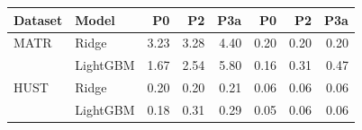 \begin{tabular}{llrrrrrr}
\toprule
Dataset & Model & P0 & P2 & P3a & P0  & P2  & P3a  \\
\midrule
MATR & Ridge & 3.23 & 3.28 & 4.40 & 0.20 & 0.20 & 0.20 \\
 & LightGBM & 1.67 & 2.54 & 5.80 & 0.16 & 0.31 & 0.47 \\
HUST & Ridge & 0.20 & 0.20 & 0.21 & 0.06 & 0.06 & 0.06 \\
 & LightGBM & 0.18 & 0.31 & 0.29 & 0.05 & 0.06 & 0.06 \\
\bottomrule
\end{tabular}
